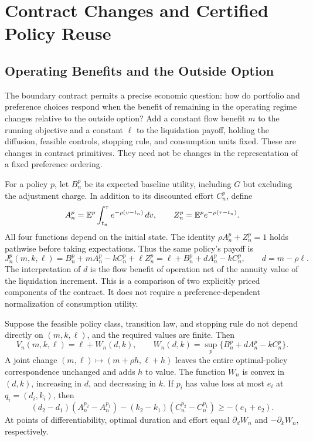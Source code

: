 \section{Contract Changes and Certified Policy Reuse}
\label{sec:contracts}
\subsection{Operating Benefits and the Outside Option}
The boundary contract permits a precise economic question: how do portfolio and preference choices respond when the benefit of remaining in the operating regime changes relative to the outside option? Add a constant flow benefit $m$ to the running objective and a constant $\ell$ to the liquidation payoff, holding the diffusion, feasible controls, stopping rule, and consumption units fixed. These are changes in contract primitives. They need not be changes in the representation of a fixed preference ordering.

For a policy $p$, let $B_n^p$ be its expected baseline utility, including $G$ but excluding the adjustment charge. In addition to its discounted effort $C_n^p$, define
\begin{equation}
 A_n^p=\mathbb E^p\int_{t_n}^{\tau}e^{-\rho(v-t_n)}\,dv,
 \qquad Z_n^p=\mathbb E^p e^{-\rho(\tau-t_n)}.
 \label{eq:duration_exposure}
\end{equation}
All four functions depend on the initial state. The identity $\rho A_n^p+Z_n^p=1$ holds pathwise before taking expectations. Thus the same policy's payoff is
\begin{equation}
 J_n^p(m,k,\ell)=B_n^p+m A_n^p-kC_n^p+\ell Z_n^p
 =\ell+B_n^p+dA_n^p-kC_n^p,\qquad d=m-\rho\ell.
 \label{eq:contract_quotient}
\end{equation}
The interpretation of $d$ is the flow benefit of operation net of the annuity value of the liquidation increment. This is a comparison of two explicitly priced components of the contract. It does not require a preference-dependent normalization of consumption utility.

\begin{proposition}
\label{thm:contract}
Suppose the feasible policy class, transition law, and stopping rule do not depend directly on $(m,k,\ell)$, and the required values are finite. Then
\begin{equation}
 V_n(m,k,\ell)=\ell+W_n(d,k),\qquad
 W_n(d,k)=\sup_p\{B_n^p+dA_n^p-kC_n^p\}.
 \label{eq:contract_value}
\end{equation}
A joint change $(m,\ell)\mapsto(m+\rho h,\ell+h)$ leaves the entire optimal-policy correspondence unchanged and adds $h$ to value. The function $W_n$ is convex in $(d,k)$, increasing in $d$, and decreasing in $k$. If $p_i$ has value loss at most $e_i$ at $q_i=(d_i,k_i)$, then
\begin{equation}
 (d_2-d_1)(A^{p_2}_n-A^{p_1}_n)
 -(k_2-k_1)(C^{p_2}_n-C^{p_1}_n)\geq-(e_1+e_2).
 \label{eq:joint_moment}
\end{equation}
At points of differentiability, optimal duration and effort equal $\partial_dW_n$ and $-\partial_kW_n$, respectively.
\end{proposition}

